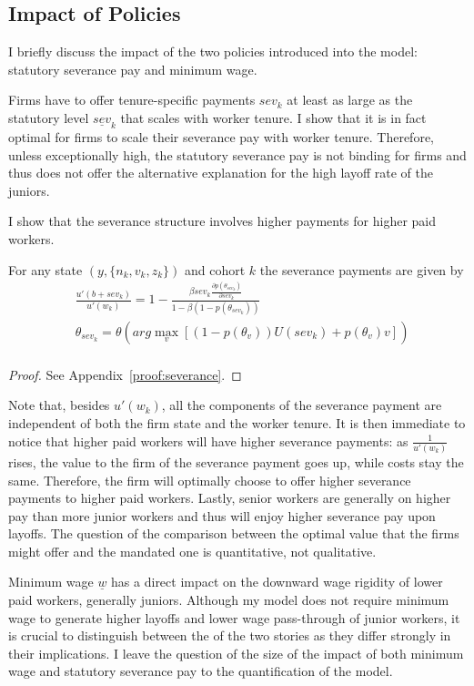 \subsection{Impact of Policies} 
\label{severance}
I briefly discuss the impact of the two policies introduced into the model: statutory severance pay and minimum wage. 

Firms have to offer tenure-specific payments $sev_k$ at least as large as the statutory level $\underline{sev}_k$ that scales with worker tenure. I show that it is in fact optimal for firms to scale their severance pay with worker tenure. Therefore, unless exceptionally high, the statutory severance pay is not binding for firms and thus does not offer the alternative explanation for the high layoff rate of the juniors.

I show that the severance structure involves higher payments for higher paid workers.
\begin{proposition}
\label{severanceprop}
For any state $(y,\{n_k,v_k,z_k\})$ and cohort $k$ the severance payments  are given by
\begin{equation*}
    \begin{split}
    & \frac{u'(b+sev_k)}{u'(w_k)}=1-\frac{\beta sev_k \frac{\partial p(\theta_{sev_k})}{\partial sev_k}}{1-\beta(1-p(\theta_{sev_k}))} \\
    & \theta_{sev_k} = \theta(arg \max_v [(1-p(\theta_v))U(sev_k)+p(\theta_v)v]) \\
    \end{split}
\end{equation*}
\end{proposition}
\begin{proof}
See Appendix~\ref{proof:severance}.
\end{proof}
Note that, besides $u'(w_k)$, all the components of the severance payment are independent of both the firm state and the worker tenure. 
It is then immediate to notice that higher paid workers will have higher severance payments: as $\frac{1}{u'(w_k)}$ rises, the value to the firm of the severance payment goes up, while costs stay the same. Therefore, the firm will optimally choose to offer higher severance payments to higher paid workers. Lastly, senior workers are generally on higher pay than more junior workers and thus will enjoy higher severance pay upon layoffs. The question of the comparison between the optimal value that the firms might offer and the mandated one is quantitative, not qualitative.

Minimum wage $\underline{w}$ has a direct impact on the downward wage rigidity of lower paid workers, generally juniors. Although my model does not require minimum wage to generate higher layoffs and lower wage pass-through of junior workers, it is crucial to distinguish between the of the two stories as they differ strongly in their implications. I leave the question of the size of the impact of both minimum wage and statutory severance pay to the quantification of the model.

